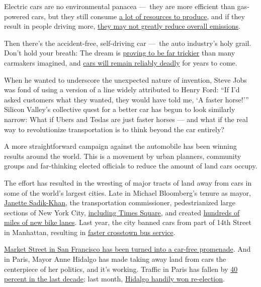 Electric cars are no environmental panacea ---~they are more efficient
than gas-powered cars, but they still consume
\href{https://www.latimes.com/business/la-fi-electric-car-cobalt-battery-20180222-story.html}{a
lot of resources to produce}, and if they result in people driving more,
\href{https://www.bloomberg.com/news/articles/2019-09-23/electric-vehicles-alone-won-t-stop-climate-change}{they
may not greatly reduce overall emissions}.

Then there's the accident-free, self-driving car ---~the auto industry's
holy grail. Don't hold your breath: The dream is
\href{https://www.investors.com/news/self-driving-cars-hit-delays-driverless-cars-timeline/}{proving
to be far trickier} than many carmakers imagined, and
\href{https://www.nytimes3xbfgragh.onion/interactive/2019/10/04/opinion/self-driving-cars-safety.html}{cars
will remain reliably deadly} for years to come.

When he wanted to underscore the unexpected nature of invention, Steve
Jobs was fond of using a version of a line widely attributed to Henry
Ford: ``If I'd asked customers what they wanted, they would have told
me, `A faster horse!''' Silicon Valley's collective quest for a better
car has begun to look similarly narrow: What if Ubers and Teslas are
just faster horses --- and what if the real way to revolutionize
transportation is to think beyond the car entirely?

A more straightforward campaign against the automobile has been winning
results around the world. This is a movement by urban planners,
community groups and far-thinking elected officials to reduce the amount
of land cars occupy.

The effort has resulted in the wresting of major tracts of land away
from cars in some of the world's largest cities. Late in Michael
Bloomberg's tenure as mayor, \href{http://www.jsadikkhan.com/}{Janette
Sadik-Khan}, the transportation commissioner, pedestrianized large
sections of New York City,
\href{https://ny.curbed.com/2017/4/19/15358234/times-square-snohetta-before-after-photos}{including
Times Square}, and created
\href{https://www.bicycling.com/news/a20006501/this-woman-built-400-miles-of-bike-lanes-in-new-york-city/}{hundreds
of miles of new bike lanes}. Last year, the city banned cars from part
of 14th Street in Manhattan, resulting in
\href{https://www.ny1.com/nyc/all-boroughs/news/2019/10/18/14th-street-busway-is-making-trips-faster--encouraging-more-trips}{faster
crosstown bus service}.

\href{https://www.sfchronicle.com/bayarea/article/Car-free-Market-What-happens-to-the-side-14999923.php}{Market
Street in San Francisco has been turned into a car-free promenade}. And
in Paris, Mayor Anne Hidalgo has made taking away land from cars the
centerpiece of her politics, and it's working. Traffic in Paris has
fallen by
\href{https://www.bloomberg.com/news/articles/2018-01-19/how-paris-shifted-away-from-the-car}{40
percent in the last decade}; last month,
\href{https://www.newstatesman.com/world/europe/2020/06/how-anne-hidalgos-anti-car-policies-won-her-re-election-paris}{Hidalgo
handily won re-election}.

